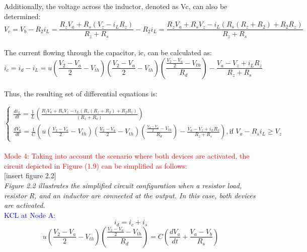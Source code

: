 Additionally, the voltage across the inductor, denoted as Vc, can also be determined:\\

\begin{equation}
    V_c=V_b-R_2i_L=\frac{R_zV_a+R_s(V_z-i_LR_z)}{R_z+R_s}-R_2i_L=\frac{R_zV_a+R_sV_z-i_L(R_s(R_z+R_2)+R_2R_z)}{R_z+R_s}
\end{equation}\\

The current flowing through the capacitor, ic, can be calculated as:\\

\begin{equation}
    i_c=i_d-i_L=u(\frac{V_2-V_a}{2}-V_{th})(\frac{V_2-V_a}{2}-V_{th})(\frac{\frac{V_2-V_a}{2}-V_{th}}{R_d})-\frac{V_a-V_z+i_LR_z}{R_z+R_s}
\end{equation}\\

Thus, the resulting set of differential equations is:

\begin{equation}
    \begin{cases}
        \frac{di_L}{dt}=\frac{1}{L}(\frac{R_zV_a+R_sV_z-i_L(R_s(R_z+R_2)+R_2R_z)}{(R_z+R_s)})\\
        \frac{dV_a}{dt}=\frac{1}{C}(u(\frac{V_2-V_a}{2}-V_{th})(\frac{V_2-V_a}{2}-V_{th})(\frac{\frac{V_2-V_a}{2}-V_{th}}{R_d})-\frac{V_a-V_z+i_LR_z}{R_z+R_s}),  \text{if } V_a-R_si_L \geq V_z
    \end{cases}
\end{equation}\\

\large\textcolor{red}{Mode 4: Taking into account the scenario where both devices are activated, the circuit depicted in Figure (1.9) can be simplified as follows:}\\

[insert figure 2.2]\\

\emph{Figure 2.2 illustrates the simplified circuit configuration when a resistor load, resistor R, and an inductor are connected at the output. In this case, both devices are activated.}\\

\textcolor{blue}{KCL at Node A:}\\
\begin{equation}
    i_d=i_c+i_s
\end{equation}
\begin{equation}
    u(\frac{V_2-V_a}{2}-V_{th})(\frac{\frac{V_2-V_a}{2}-V_{th}}{R_d})=C(\frac{dV_a}{dt}+\frac{V_a-V_b}{R_s})
\end{equation}\\

